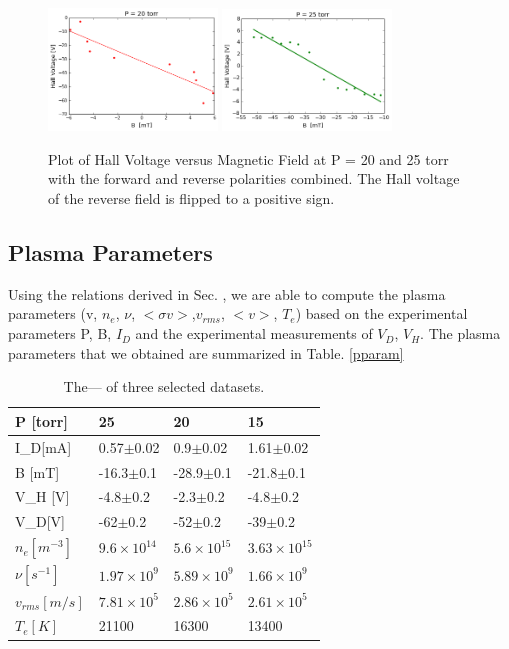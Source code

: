 \documentclass{sigchi}
\begin{document}
\begin{figure}[h]
\includegraphics[width=0.40\textwidth]{plots/P20HB.png}
\includegraphics[width=0.40\textwidth]{plots/P25HB.png}
\caption{Plot of Hall Voltage versus Magnetic Field at P = 20 and 25 torr with the forward and reverse polarities combined. The Hall voltage of the reverse field is flipped to a positive sign.}
\label{HBplot}
\end{figure}
\subsection{Plasma Parameters}
Using the relations derived in Sec. \label{sec:plasma_param_theory}, we are able to compute the plasma parameters (v, $n_e$, $\nu$, $<\sigma v>$,$v_{rms}$, $<v>$, $T_e$)
based on the experimental parameters P, B, $I_D$ and  the experimental measurements of  $V_D$, $V_H$. 
The plasma parameters that we obtained are summarized in Table. \ref{pparam}




\begin{table}[]
\centering
\caption{The--- of three selected datasets.}
\label{my-label}
\begin{tabular}{|l|l|l|l|}
\hline
P {[}torr{]}    & 25                 & 20                 & 15                   \\ \hline
I\_D{[}mA{]}    & 0.57$\pm$0.02      & 0.9$\pm$0.02       & 1.61$\pm$0.02        \\ \hline
B {[}mT{]}      & -16.3$\pm$0.1      & -28.9$\pm$0.1      & -21.8$\pm$0.1        \\ \hline
V\_H {[}V{]}    & -4.8$\pm$0.2       & -2.3$\pm$0.2       & -4.8$\pm$0.2         \\ \hline
V\_D{[}V{]}     & -62$\pm$0.2        & -52$\pm$0.2        & -39$\pm$0.2          \\ \hline
$n_e [m^{-3}]$  & $9.6\times10^{14}$ & $5.6\times10^{15}$ & $3.63\times 10^{15}$ \\ \hline
$\nu [s^{-1}]$  & $1.97\times10^9$   & $5.89\times10^9$   & $1.66\times10^9$     \\ \hline
$v_{rms} [m/s]$ & $7.81\times10^5$   & $2.86\times10^5$   & $2.61\times10^5$     \\ \hline
$T_e [K]$       & 21100              & 16300              & 13400                \\ \hline
\end{tabular}
\end{table}
\end{document}
